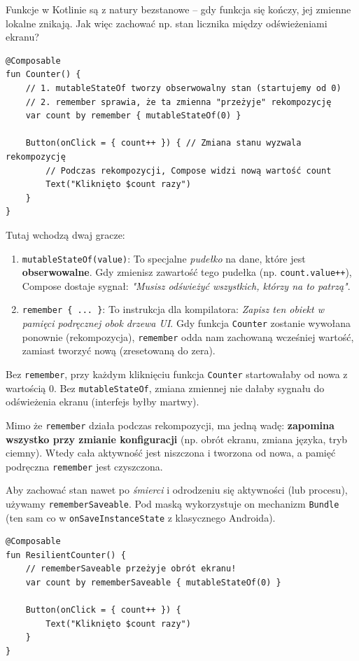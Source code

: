 Funkcje w Kotlinie są z natury bezstanowe – gdy funkcja się kończy, jej zmienne lokalne znikają. Jak więc zachować np. stan licznika między odświeżeniami ekranu?

\begin{verbatim}
@Composable
fun Counter() {
    // 1. mutableStateOf tworzy obserwowalny stan (startujemy od 0)
    // 2. remember sprawia, że ta zmienna "przeżyje" rekompozycję
    var count by remember { mutableStateOf(0) }

    Button(onClick = { count++ }) { // Zmiana stanu wyzwala rekompozycję
        // Podczas rekompozycji, Compose widzi nową wartość count
        Text("Kliknięto $count razy") 
    }
}
\end{verbatim}

Tutaj wchodzą dwaj gracze:

\begin{enumerate}
    \item \texttt{mutableStateOf(value)}: To specjalne \textit{pudełko} na dane, które jest \textbf{obserwowalne}. Gdy zmienisz zawartość tego pudełka (np. \texttt{count.value++}), Compose dostaje sygnał: \textit{"Musisz odświeżyć wszystkich, którzy na to patrzą"}.
    \item \texttt{remember \{ ... \}}: To instrukcja dla kompilatora: \textit{Zapisz ten obiekt w pamięci podręcznej obok drzewa UI}. Gdy funkcja \texttt{Counter} zostanie wywołana ponownie (rekompozycja), \texttt{remember} odda nam zachowaną wcześniej wartość, zamiast tworzyć nową (zresetowaną do zera).
\end{enumerate}

Bez \texttt{remember}, przy każdym kliknięciu funkcja \texttt{Counter} startowałaby od nowa z wartością 0. Bez \texttt{mutableStateOf}, zmiana zmiennej nie dałaby sygnału do odświeżenia ekranu (interfejs byłby martwy).

Mimo że \texttt{remember} działa podczas rekompozycji, ma jedną wadę: \textbf{zapomina wszystko przy zmianie konfiguracji} (np. obrót ekranu, zmiana języka, tryb ciemny). Wtedy cała aktywność jest niszczona i tworzona od nowa, a pamięć podręczna \texttt{remember} jest czyszczona.

Aby zachować stan nawet po \textit{śmierci} i odrodzeniu się aktywności (lub procesu), używamy \texttt{rememberSaveable}. Pod maską wykorzystuje on mechanizm \texttt{Bundle} (ten sam co w \texttt{onSaveInstanceState} z klasycznego Androida).

\begin{verbatim}
@Composable
fun ResilientCounter() {
    // rememberSaveable przeżyje obrót ekranu!
    var count by rememberSaveable { mutableStateOf(0) }

    Button(onClick = { count++ }) {
        Text("Kliknięto $count razy")
    }
}
\end{verbatim}

